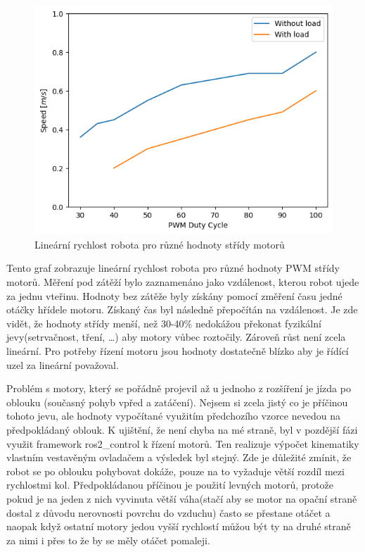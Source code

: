 \begin{figure}[h!]
	\centering
	\includegraphics[scale=0.75]{obrazky-figures/motors_graph.png}
	\caption{Lineární rychlost robota pro různé hodnoty střídy motorů}
	\label{}
\end{figure}
Tento graf zobrazuje lineární rychlost robota pro různé hodnoty PWM střídy motorů. Měření pod zátěží bylo zaznamenáno jako vzdálenost, kterou robot ujede za jednu vteřinu. Hodnoty bez zátěže byly získány pomocí změření času jedné otáčky hřídele motoru. Získaný čas byl následně přepočítán na vzdálenost. Je zde vidět, že hodnoty střídy menší, než 30-40\% nedokážou překonat fyzikální jevy(setrvačnost, tření, \dots) aby motory vůbec roztočily. Zároveň růst není zcela lineární. Pro potřeby řízení motoru jsou hodnoty dostatečně blízko aby je řídící uzel za lineární považoval.

Problém s motory, který se pořádně projevil až u jednoho z rozšíření je jízda po oblouku (současný pohyb vpřed a zatáčení). Nejsem si zcela jistý co je příčinou tohoto jevu, ale hodnoty vypočítané využitím předchozího vzorce nevedou na předpokládaný oblouk. K ujištění, že není chyba na mé straně, byl v pozdější fázi využit framework ros2\_control k řízení motorů. Ten realizuje výpočet kinematiky vlastním vestavěným ovladačem a výsledek byl stejný. Zde je důležité zmínit, že robot se po oblouku pohybovat dokáže, pouze na to vyžaduje větší rozdíl mezi rychlostmi kol. Předpokládanou příčinou je použití levných motorů, protože pokud je na jeden z nich vyvinuta větší váha(stačí aby se motor na opační straně dostal z důvodu nerovnosti povrchu do vzduchu) často se přestane otáčet a naopak když ostatní motory jedou vyšší rychlostí můžou být ty na druhé straně  za nimi i přes to že by se měly otáčet pomaleji.

